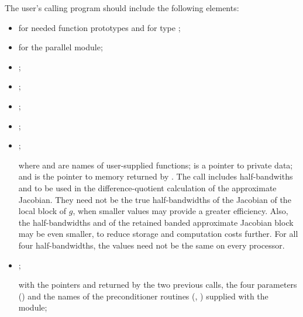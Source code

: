 The user's calling program should include the following elements:
\begin{itemize}
  
\item  {} 
  for needed function prototypes and for type ;
  
\item {} 
  for the parallel {\nvector} module;
  
\item  {};
  
\item  {};

\item  {};

\item  {};

\item  {}
  \newline\hspace*{1in};

  where  and  are names of user-supplied
  functions;  is a pointer to private data; and 
  is the pointer to {\cvode} memory returned by .
  The  call includes half-bandwiths  and    
  to be used in the difference-quotient calculation of the    
  approximate Jacobian.  They need not be the true            
  half-bandwidths of the Jacobian of the local block of $g$,    
  when smaller values may provide a greater efficiency.       
  Also, the half-bandwidths  and  of the retained 
  banded approximate Jacobian block may be even smaller,      
  to reduce storage and computation costs further.            
  For all four half-bandwidths, the values need not be the    
  same on every processor.
  
\item  {}
  \newline\hspace*{1in}; 

  with the pointers  and  returned by the two previous calls,
  the four {\spgmr} parameters () and the
  names of the preconditioner routines (, )
  supplied with the {\cvbbdpre} module;
  

\end{itemize}
